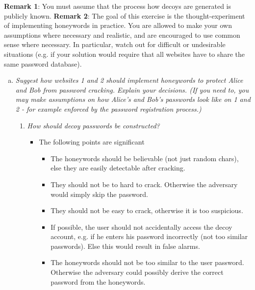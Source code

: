 \textbf{Remark 1}: You must assume that the process how decoys are generated is publicly known.
\textbf{Remark 2}: The goal of this exercise is the thought-experiment of implementing honeywords in practice. You are allowed to make your own assumptions where necessary and realistic, and are encouraged to use common sense where necessary. In particular, watch out for difficult or undesirable situations (e.g. if your solution would require that all websites have to share the same password database).
\begin{enumerate}[(a)]
    \item {\itshape Suggest how websites 1 and 2 should implement honeywords to protect Alice and Bob from password cracking. Explain your decisions. (If you need to, you may make assumptions on how Alice’s and Bob’s passwords look like on 1 and 2 - for example enforced by the password registration process.)}
    \begin{enumerate}[1.]
        \item {\itshape How should decoy passwords be constructed?}
        
        \begin{itemize}
            \item The following points are significant
            \begin{itemize}
                \item The honeywords should be believable (not just random chars), else they are easily detectable  after cracking.
                \item They should not be to hard to crack. Otherwise the adversary would simply skip the password.
                \item They should not be easy to crack, otherwise it is too suspicious.
                \item If possible, the user should not accidentally access the decoy account, e.g. if he enters his password incorrectly (not too similar passwords). Else this would result in false alarms.
                \item The honeywords should not be too similar to the user password. Otherwise the adversary could possibly derive the correct password from the honeywords.
            \end{itemize}
            

\end{itemize}
\end{enumerate}
\end{enumerate}
